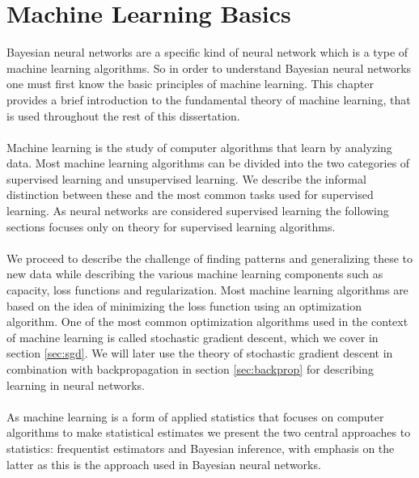 \chapter{Machine Learning Basics}
Bayesian neural networks are a specific kind of neural network which is a type of machine learning algorithms. So in order to understand Bayesian neural networks one must first know the basic principles of machine learning. This chapter provides a brief introduction to the fundamental theory of machine learning, that is used throughout the rest of this dissertation. \\
\\
Machine learning is the study of computer algorithms that learn by analyzing data. Most machine learning algorithms can be divided into the two categories of supervised learning and unsupervised learning. We describe the informal distinction between these and the most common tasks used for supervised learning. As neural networks are considered supervised learning the following sections focuses only on theory for supervised learning algorithms.\\
\\
We proceed to describe the challenge of finding patterns and generalizing these to new data while describing the various machine learning components such as capacity, loss functions and regularization. Most machine learning algorithms are based on the idea of minimizing the loss function using an optimization algorithm. One of the most common optimization algorithms used in the context of machine learning is called stochastic gradient descent, which we cover in section \ref{sec:sgd}. We will later use the theory of stochastic gradient descent in combination with backpropagation in section \ref{sec:backprop} for describing learning in neural networks.\\
\\
As machine learning is a form of applied statistics that focuses on computer algorithms to make statistical estimates we present the two central approaches to statistics: frequentist estimators and Bayesian inference, with emphasis on the latter as this is the approach used in Bayesian neural networks.

